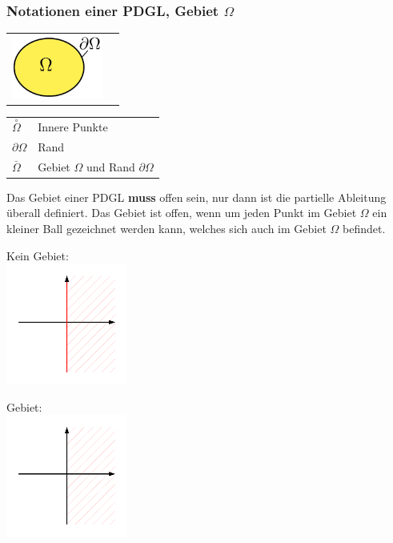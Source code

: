 \subsubsection{Notationen einer PDGL, Gebiet $\Omega$}
\begin{minipage}{4cm}
	\begin{tabular}{ll}
	\includegraphics[width=3cm]{Content/01_theory/Gebiet}&
	\end{tabular}
\end{minipage}
\begin{minipage}{4cm}	
	\begin{tabular}{ll}
		$\overset{\circ}{\Omega}$ & Innere Punkte\\
		$\partial\Omega$ & Rand\\
		$\overset{\_}{\Omega}$ & Gebiet $\Omega$ und Rand $\partial\Omega$\\
	\end{tabular}
\end{minipage}

Das Gebiet einer PDGL \textbf{muss} offen sein, nur dann ist die partielle
Ableitung überall definiert. Das Gebiet ist offen, wenn um jeden Punkt im Gebiet
$\Omega$ ein kleiner Ball gezeichnet werden kann, welches sich auch im Gebiet $\Omega$ befindet.\\

\begin{minipage}{4cm}
	Kein Gebiet:\\
	\includegraphics[width=4cm]{Content/01_theory/gebiet_1.pdf}\\

\end{minipage}
\begin{minipage}{4cm}
  	Gebiet:\\
  	\includegraphics[width=4cm]{Content/01_theory/gebiet_2.pdf}\\
\end{minipage}

